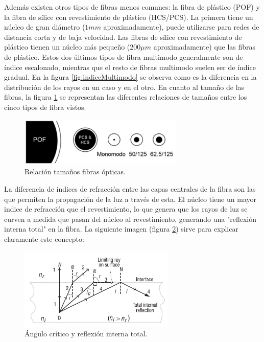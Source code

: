 \begin{itemize}
 	Además existen otros tipos de fibras menos comunes: la fibra de plástico (POF) y la fibra de sílice con revestimiento de plástico (HCS/PCS). La primera tiene un núcleo de gran diámetro ($1mm$ aproximadamente), puede utilizarse para redes de distancia corta y de baja velocidad. Las fibras de sílice con revestimiento de plástico tienen un núcleo más pequeño ($200\mu m$ aproximadamente) que las fibras de plástico. Estos dos últimos tipos de fibra multimodo generalmente son de índice escalonado, mientras que el resto de fibras multimodo suelen ser de índice gradual. En la figura \ref{fig:indiceMultimodo} se observa como es la diferencia en la distribución de los rayos en un caso y en el otro. En cuanto al tamaño de las fibras, la figura \ref{fig:otrosTiposFO} se representan las diferentes relaciones de tamaños entre los cinco tipos de fibra vistos. \cite{FOA}
 	 	
 	 \begin{figure}[H]
 	 	\centering
 	 	\includegraphics[width=0.7\textwidth]{./img/tiposFO}
 	 	\caption{Relación tamaños fibras ópticas. \cite{FOA} } 
 	 	\label{fig:otrosTiposFO}
 	 \end{figure} 	
  	
 La diferencia de índices de refracción entre las capas centrales de la fibra son las que permiten la propagación de la luz a través de esta. El núcleo tiene un mayor indice de refracción que el revestimiento, lo que genera que los rayos de luz se curven a medida que pasan del núcleo al revestimiento, generando una "reflexión interna total" en la fibra. La siguiente imagen (figura \ref{fig:TIR}) sirve para explicar claramente este concepto:
 
 \begin{figure}[H]
 	\centering
 	\includegraphics[width=0.66\textwidth]{./img/TIR}
 	\caption{Ángulo crítico y reflexión interna total. \cite{geometriaBasicaFP} } 
 	\label{fig:TIR}
 \end{figure}
 

\end{itemize}
